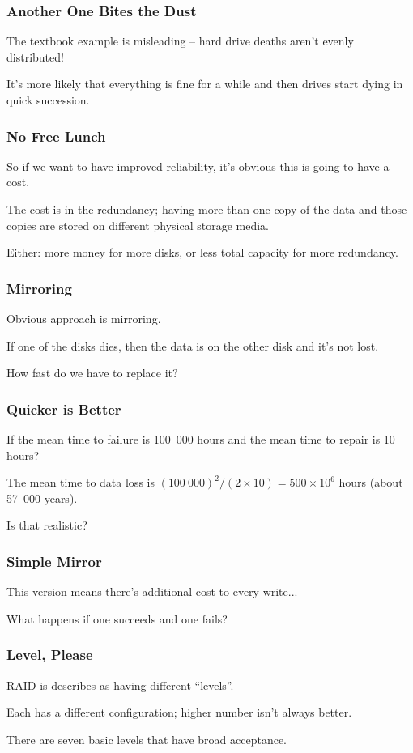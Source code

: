 \begin{frame}
\frametitle{Another One Bites the Dust}

The textbook example is misleading -- hard drive deaths aren't evenly distributed!

It's more likely that everything is fine for a while and then drives start dying in quick succession. 


\end{frame}


\begin{frame}
\frametitle{No Free Lunch}

So if we want to have improved reliability, it's obvious this is going to have a cost. 

The cost is in the redundancy; having more than one copy of the data and those copies are stored on different physical storage media.

Either: more money for more disks, or less total capacity for more redundancy.

\end{frame}


\begin{frame}
\frametitle{Mirroring}

Obvious approach is \alert{mirroring}.

If one of the disks dies, then the data is on the other disk and it's not lost.


How fast do we have to replace it?
\end{frame}


\begin{frame}
\frametitle{Quicker is Better}

If the mean time to failure is 100~000 hours and the mean time to repair is 10 hours?

The mean time to data loss is $(100~000)^{2}/(2 \times 10) = 500 \times 10^{6}$ hours (about 57~000 years).

Is that realistic?

\end{frame}


\begin{frame}
\frametitle{Simple Mirror}

This version means there's additional cost to every write...

What happens if one succeeds and one fails?

\end{frame}


\begin{frame}
\frametitle{Level, Please}

RAID is describes as having different ``levels''.

Each has a different configuration; higher number isn't always better.

There are seven basic levels that have broad acceptance.

\end{frame}


